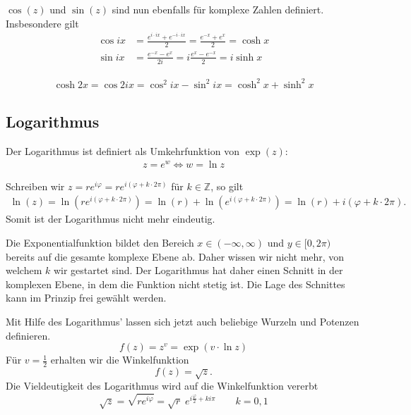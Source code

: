 \begin{Bemerkung}
$\cos{(z)}$ und $\sin{(z)}$ sind nun ebenfalls für komplexe Zahlen definiert. 
Insbesondere gilt
\begin{align*}
\cos ix & = \frac{e^{i\cdot ix}+e^{-i\cdot ix}}{2} = \frac{e^{-x}+e^x}{2} =
\cosh x \\
\sin ix & = \frac{e^{-x}-e^x}{2i} = i\frac{e^x-e^{-x}}{2} = i\sinh x
\end{align*}
\end{Bemerkung}

\begin{Beispiel}
\begin{align*}
\cosh 2x = \cos 2ix = \cos^2 ix - \sin^2 ix = \cosh^2 x + \sinh^2 x
\end{align*}
\end{Beispiel}

\subsection {Logarithmus}
\begin{Definition}
Der Logarithmus ist definiert als Umkehrfunktion von $\exp(z)$:
\begin{align*}
z = e^w \Leftrightarrow w = \ln z
\end{align*} 
\end{Definition}

Schreiben wir $z = re^{i\varphi} = re^{i(\varphi + k\cdot2\pi)}$ für $k \in
\mathbb{Z}$, so gilt
\begin{align*}
\ln(z) = \ln\left( re^{i(\varphi + k\cdot2\pi)} \right) = \ln(r) +
\ln\left( e^{i(\varphi + k\cdot2\pi)} \right) = \ln(r) + i(\varphi +
k\cdot2\pi).
\end{align*}
Somit ist der Logarithmus nicht mehr eindeutig.
\par
Die Exponentialfunktion bildet den Bereich $x \in (-\infty, \infty)$ und $y \in
[0,2\pi)$ bereits auf die gesamte komplexe Ebene ab. Daher wissen wir nicht
mehr, von welchem $k$ wir gestartet sind. Der Logarithmus hat daher einen
Schnitt in der komplexen Ebene, in dem die Funktion nicht stetig ist. Die Lage
des Schnittes kann im Prinzip frei gewählt werden.
\par
Mit Hilfe des Logarithmus' lassen sich jetzt auch beliebige Wurzeln und Potenzen
definieren.
\begin{equation*}
f(z) = z^v = \exp(v \cdot \ln z)
\end{equation*}
Für $v = \frac{1}{2}$ erhalten wir die Winkelfunktion
\begin{equation*}
f(z) = \sqrt{z}.
\end{equation*}
Die Vieldeutigkeit des Logarithmus wird auf die Winkelfunktion vererbt
\begin{equation*}
\sqrt{z} = \sqrt{re^{i\varphi}} = \sqrt{r}\;e^{i\frac{\varphi}{2}+ki\pi} \qquad
k = 0,1
\end{equation*}

